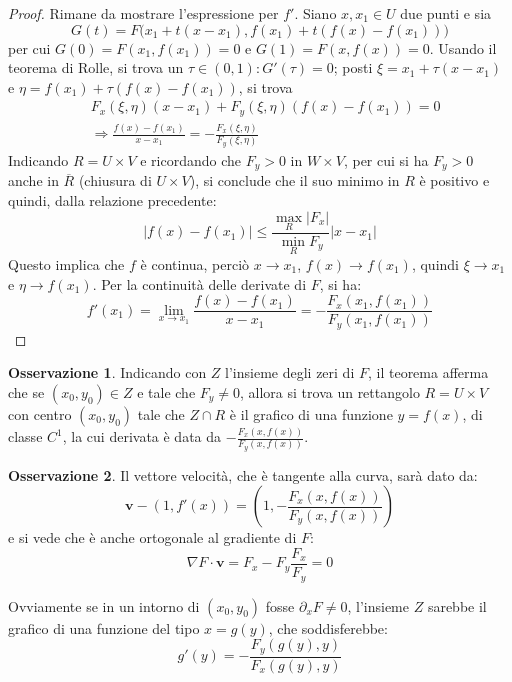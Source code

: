 \documentclass[10pt, a4paper]{scrartcl}
\theoremstyle{definition}
\numberwithin{esempio}{section}
\theoremstyle{definition}
\newtheorem{obs}{Osservazione}
\numberwithin{obs}{section}
\numberwithin{nota}{section}
\numberwithin{equation}{subsection}
\begin{document}
\begin{teorema}
\begin{proof}
Rimane da mostrare l'espressione per $f'$.
Siano $x,x_1 \in U$ due punti e sia
\[
G(t)  = F\big(x_1+t(x-x_1),f(x_1) +  t (f(x)-f(x_1))\big)
\] 
per cui $G(0) =  F(x_1,f(x_1))  = 0$ e $G(1) = F(x,f(x))=0$. 
Usando il teorema di Rolle, si trova un $\tau  \in (0,1) :  G'(\tau ) = 0 $; posti $\xi  = x_1 + \tau (x-x_1)$ e $\eta = f(x_1) + \tau (f(x) - f(x_1))$, si trova
\[
\begin{split}
	&F_x(\xi ,\eta) (x-x_1) + F_y(\xi ,\eta)(f(x)-f(x_1)) = 0\\
	&\Rightarrow \frac{f(x) -f(x_1)}{x-x_1} = - \frac{F_x(\xi ,\eta)}{F_y(\xi ,\eta)}
\end{split}
\] 
Indicando $R = U \times V$ e ricordando che $F_y > 0$ in $W\times V$, per cui si ha $F_y > 0$ anche in $\overline{R}$ (chiusura di $U \times V$), si conclude che il suo minimo in $R$ \`e positivo e quindi, dalla relazione precedente:
\[
\lvert f(x) - f(x_1) \rvert \le \frac{\max_R \lvert F_x \rvert }{\min_R F_y}\lvert x-x_1 \rvert 
\] 
Questo implica che $f$ \`e continua, perci\`o $x\to x_1$, $f(x) \to f(x_1)$, quindi $\xi  \to  x_1$ e $\eta \to f(x_1)$.
Per la continuit\`a delle derivate di $F$, si ha:
\[
f'(x_1) =  \lim_{x \to x_1} \frac{f(x) - f(x_1)}{x-x_1}= -  \frac{F_x(x_1,f(x_1))}{F_y(x_1,f(x_1))}
\] 

\end{proof}
\end{teorema}
\begin{obs}
	Indicando con $Z$ l'insieme degli zeri di $F$, il teorema afferma che se $(x_0,y_0) \in Z$ e tale che $F_y\neq 0$, allora si trova un rettangolo $R = U \times V$ con centro $(x_0,y_0)$ tale che $Z \cap R$ \`e il grafico di una funzione $y=f(x)$, di classe $C^1$, la cui derivata \`e data da $-\frac{F_x(x,f(x))}{F_y(x,f(x))}$.
\end{obs}
\begin{obs}
Il vettore velocit\`a, che \`e tangente alla curva, sar\`a dato da:
\begin{equation}
	\mathbf{v} - (1 , f'(x) ) = \left(1 , - \frac{F_x(x,f(x))}{F_y(x,f(x))}\right) 
\end{equation}
e si vede che \`e anche ortogonale al gradiente di $F$:
\[
	\nabla F \cdot \mathbf{v} = F_x - F_y \frac{F_x}{F_y}=0
\] 
\end{obs}
Ovviamente se in un intorno di $(x_0,y_0)$ fosse $\partial _x F \neq 0$, l'insieme $Z$ sarebbe il grafico di una funzione del tipo $x = g(y)$, che soddisferebbe:
\begin{equation}
	g'(y) = - \frac{F_y(g(y),y)}{F_x(g(y),y)}
\end{equation}
\end{document}
